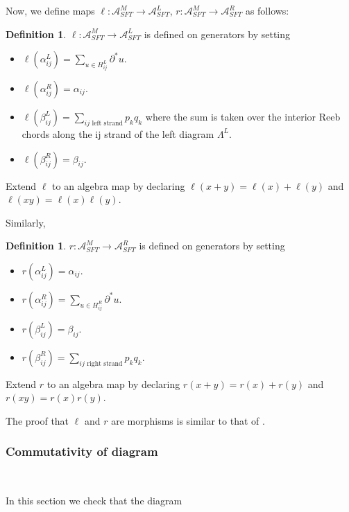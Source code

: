 \documentclass[a4paper,final, reqno]{amsart}
\theoremstyle{plain}
\theoremstyle{definition}
\newtheorem{Def}[Th]{Definition}
\newcommand{\A}{\mathcal{A}}
\begin{document}
	
	Now, we define maps $\ell: \A^M_{SFT} \to \A^L_{SFT}$, $r:\A^M_{SFT} \to \A^R_{SFT}$ as follows:
	\begin{Def}
		$\ell: \A^M_{SFT} \to \A^L_{SFT}$ is defined on generators by setting
		\begin{itemize}
			\item $\ell(\alpha_{ij}^L) = \sum_{u\in H_{ij}^L} \partial^* u$.
			
			\item $\ell(\alpha_{ij}^R) = \alpha_{ij}$.
			
			\item $\ell(\beta_{ij}^L) = \sum_{ij \text{ left strand}} p_kq_k$ where the sum is taken over the interior Reeb chords along the ij strand of the left diagram $\Lambda^L$.
			
			\item $\ell(\beta_{ij}^R) = \beta_{ij}$.
		\end{itemize}
		Extend $\ell$ to an algebra map by declaring $\ell(x+y) = \ell(x) + \ell(y)$ and $\ell(xy) = \ell(x)\ell(y)$.
	\end{Def}
	
	Similarly,
	
	\begin{Def}
		$r: \A^M_{SFT} \to \A^R_{SFT}$ is defined on generators by setting
		\begin{itemize}
			\item $r(\alpha_{ij}^L) = \alpha_{ij}$.
			
			\item $r(\alpha_{ij}^R) = \sum_{u \in H_{ij}^R} \partial^*u$.
			
			\item $r(\beta_{ij}^L) = \beta_{ij}$.
			
			\item $r(\beta_{ij}^R) = \sum_{ij \text{ right strand}} p_kq_k$.
		\end{itemize}
		Extend $r$ to an algebra map by declaring $r(x+y) = r(x) + r(y)$ and $r(xy) = r(x)r(y)$.
	\end{Def}
	
	The proof that $\ell$ and $r$ are morphisms is similar to that of .
	
	\subsubsection{Commutativity of diagram}\-\
	
	In this section we check that the diagram
	
\end{document}
